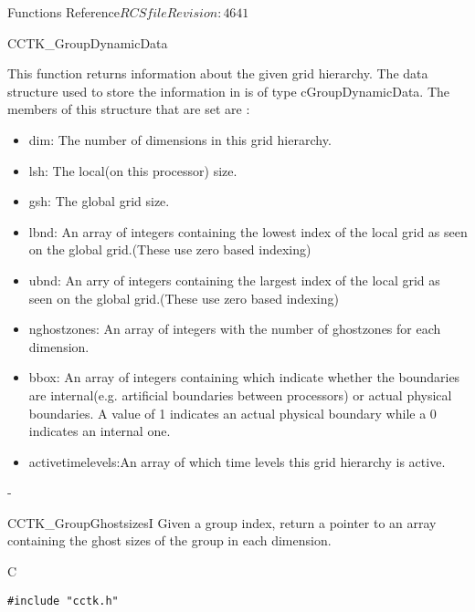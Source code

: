 \begin{cactuspart}{ Functions Reference}{$RCSfile$}{$Revision: 4641 $}
\begin{FunctionDescription}{CCTK\_GroupDynamicData}{}
\begin{Discussion}
This function returns information about the given grid hierarchy.
The data structure used to store the information in is of type cGroupDynamicData.
The members of this structure that are set are :
\begin{itemize}
\item{dim:} The number of dimensions in this grid hierarchy.
\item {lsh:} The local(on this processor) size.
\item{gsh:} The global grid size.
\item{lbnd:} An array of integers containing the lowest index of the local grid as seen on the global grid.(These use zero based indexing)
\item{ubnd:} An arry of integers containing the largest index of the local grid as seen on the global grid.(These use zero based indexing)
\item{nghostzones:} An array of integers with the number of ghostzones for each dimension.
\item{bbox:} An array of integers containing which indicate whether the boundaries are internal(e.g. artificial boundaries between processors) or actual physical boundaries. A value of 1 indicates an actual physical boundary while a 0 indicates an internal one.
\item{activetimelevels:}An array of which time levels this grid hierarchy is active.
\end{itemize}-
\end{Discussion}

\end{FunctionDescription}

\begin{FunctionDescription}{CCTK\_GroupGhostsizesI}
\label{CCTK-GroupGhostsizesI}
Given a group index, return a pointer to an array containing the ghost sizes of the group in each dimension.
 
\begin{SynopsisSection}
\begin{Synopsis}{C}
\begin{verbatim}
#include "cctk.h"


\end{verbatim}
\end{Synopsis}
\end{SynopsisSection}
\end{FunctionDescription}
\end{cactuspart}
